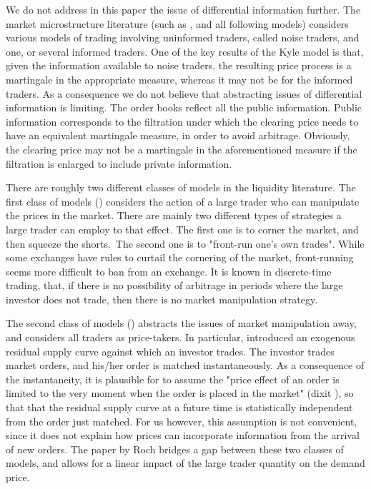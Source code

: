 \documentclass{article}
\begin{document}
We do not address in this paper the issue of differential information
further. The market microstructure literature (such as \cite{Kyl85}, and all
following models) considers various models of trading involving uninformed
traders, called noise traders, and one, or several informed traders. One of
the key results of the Kyle model is that, given the information available
to noise traders, the resulting price process is a martingale in the
appropriate measure, whereas it may not be for the informed traders. As a
consequence we do not believe that abstracting issues of differential
information is limiting. The order books reflect all the public information.
Public information corresponds to the filtration under which the clearing
price needs to have an equivalent martingale measure, in order to avoid
arbitrage. Obviously, the clearing price may not be a martingale in the
aforementioned measure if the filtration is enlarged to include private
information.

There are roughly two different classes of models in the liquidity
literature. The first class of models (\cite{BB04,BK15a, BK15b,Fre98, Jar92,
Jar94, PS98a, PS98b, RS10, SW00}) considers the action of a large trader who
can manipulate the prices in the market. There are mainly two different
types of strategies a large trader can employ to that effect. The first one
is to corner the market, and then squeeze the shorts.\ The second one is to
"front-run one's own trades". While some exchanges have rules to curtail the
cornering of the market, front-running seems more difficult to ban from an
exchange. It is known in discrete-time trading, that, if there is no
possibility of arbitrage in periods where the large investor does not trade,
then there is no market manipulation strategy.

The second class of models (\cite{CR07, CJP04, CST10,GS11}) abstracts the
issues of market manipulation away, and considers all traders as
price-takers. In particular, \cite{CJP04} introduced an exogenous residual
supply curve against which an investor trades. The investor trades market
orders, and his/her order is matched instantaneously. As a consequence of
the instantaneity, it is plausible for \cite{CJP04} to assume the "price
effect of an order is limited to the very moment when the order is placed in
the market" (dixit \cite{BB04}), so that that the residual supply curve at a
future time is statistically independent from the order just matched. For us
however, this assumption is not convenient, since it does not explain how
prices can incorporate information from the arrival of new orders. The paper
by Roch \cite{RA11} bridges a gap between these two classes of models, and
allows for a linear impact of the large trader quantity on the demand price.
\end{document}
